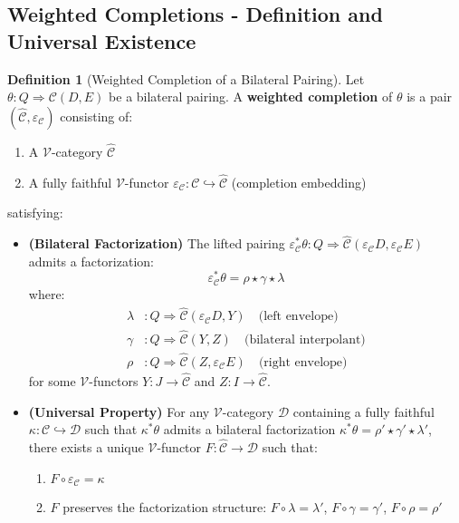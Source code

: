 \documentclass[11pt]{article}
\theoremstyle{plain}
\theoremstyle{definition}
\newtheorem{definition}[theorem]{Definition}
\theoremstyle{remark}
\newcommand{\V}{\mathcal{V}}
\begin{document}
\subsection{Weighted Completions - Definition and Universal Existence}

\begin{definition}[Weighted Completion of a Bilateral Pairing]\label{def:weighted-completion}
Let $\theta : Q \Rightarrow \mathcal{C}(D,E)$ be a bilateral pairing. A \textbf{weighted completion} of $\theta$ is a pair $(\widehat{\mathcal{C}}, \varepsilon_{\mathcal{C}})$ consisting of:
\begin{enumerate}
\item A $\V$-category $\widehat{\mathcal{C}}$
\item A fully faithful $\V$-functor $\varepsilon_{\mathcal{C}} : \mathcal{C} \hookrightarrow \widehat{\mathcal{C}}$ (completion embedding)
\end{enumerate}
satisfying:

\begin{itemize}
\item \textbf{(Bilateral Factorization)} The lifted pairing $\varepsilon_{\mathcal{C}}^* \theta : Q \Rightarrow \widehat{\mathcal{C}}(\varepsilon_{\mathcal{C}} D, \varepsilon_{\mathcal{C}} E)$ admits a factorization:
$$\varepsilon_{\mathcal{C}}^* \theta = \rho \star \gamma \star \lambda$$
where:
\begin{align}
\lambda &: Q \Rightarrow \widehat{\mathcal{C}}(\varepsilon_{\mathcal{C}} D, Y) \quad \text{(left envelope)} \\
\gamma &: Q \Rightarrow \widehat{\mathcal{C}}(Y, Z) \quad \text{(bilateral interpolant)} \\
\rho &: Q \Rightarrow \widehat{\mathcal{C}}(Z, \varepsilon_{\mathcal{C}} E) \quad \text{(right envelope)}
\end{align}
for some $\V$-functors $Y : J \to \widehat{\mathcal{C}}$ and $Z : I \to \widehat{\mathcal{C}}$.

\item \textbf{(Universal Property)} For any $\V$-category $\mathcal{D}$ containing a fully faithful $\kappa : \mathcal{C} \hookrightarrow \mathcal{D}$ such that $\kappa^* \theta$ admits a bilateral factorization $\kappa^* \theta = \rho' \star \gamma' \star \lambda'$, there exists a unique $\V$-functor $F : \widehat{\mathcal{C}} \to \mathcal{D}$ such that:
\begin{enumerate}
\item $F \circ \varepsilon_{\mathcal{C}} = \kappa$
\item $F$ preserves the factorization structure: $F \circ \lambda = \lambda'$, $F \circ \gamma = \gamma'$, $F \circ \rho = \rho'$
\end{enumerate}
\end{itemize}
\end{definition}
\end{document}

